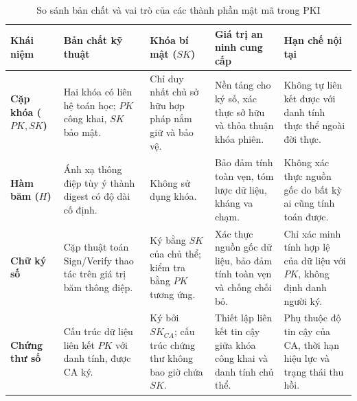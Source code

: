 \begin{table}[!htbp]
\centering
\caption{So sánh bản chất và vai trò của các thành phần mật mã trong PKI}
\label{tab:crypto_comparison}
\small
\renewcommand{\arraystretch}{1.3}
\begin{tabularx}{\textwidth}{@{}l >{\raggedright\arraybackslash}p{3.2cm} >{\raggedright\arraybackslash}p{2.6cm} >{\raggedright\arraybackslash}X >{\raggedright\arraybackslash}p{3.2cm}@{}}
\toprule
\textbf{Khái niệm} & \textbf{Bản chất kỹ thuật} & \textbf{Khóa bí mật ($SK$)} & \textbf{Giá trị an ninh cung cấp} & \textbf{Hạn chế nội tại} \\
\midrule
\textbf{Cặp khóa ($PK, SK$)} & 
Hai khóa có liên hệ toán học; $PK$ công khai, $SK$ bảo mật. & 
Chỉ duy nhất chủ sở hữu hợp pháp nắm giữ và bảo vệ. & 
Nền tảng cho ký số, xác thực sở hữu và thỏa thuận khóa phiên. & 
Không tự liên kết được với danh tính thực thể ngoài đời thực. \\
\midrule
\textbf{Hàm băm ($H$)} & 
Ánh xạ thông điệp tùy ý thành digest có độ dài cố định. & 
Không sử dụng khóa. & 
Bảo đảm tính toàn vẹn, tóm lược dữ liệu, kháng va chạm. & 
Không xác thực nguồn gốc do bất kỳ ai cũng tính toán được. \\
\midrule
\textbf{Chữ ký số} & 
Cặp thuật toán Sign/Verify thao tác trên giá trị băm thông điệp. & 
Ký bằng $SK$ của chủ thể; kiểm tra bằng $PK$ tương ứng. & 
Xác thực nguồn gốc dữ liệu, bảo đảm tính toàn vẹn và chống chối bỏ. & 
Chỉ xác minh tính hợp lệ của dữ liệu với $PK$, không định danh người ký. \\
\midrule
\textbf{Chứng thư số} & 
Cấu trúc dữ liệu liên kết $PK$ với danh tính, được CA ký. & 
Ký bởi $SK_{CA}$; cấu trúc chứng thư không bao giờ chứa $SK$. & 
Thiết lập liên kết tin cậy giữa khóa công khai và danh tính chủ thể. & 
Phụ thuộc độ tin cậy của CA, thời hạn hiệu lực và trạng thái thu hồi. \\
\bottomrule
\end{tabularx}
\end{table}
